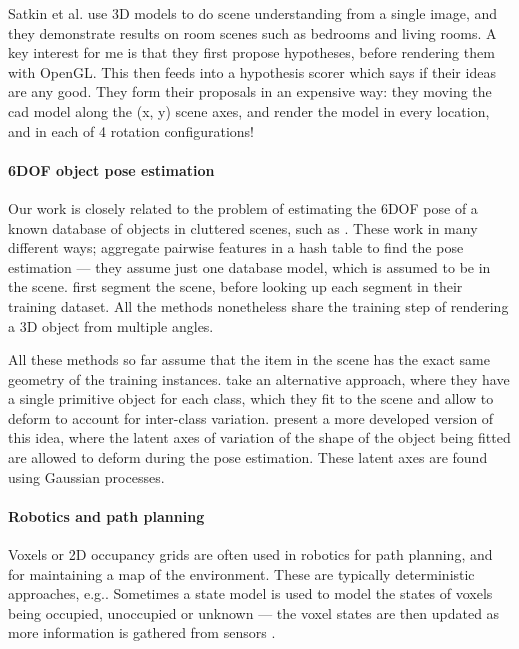 \documentclass[10pt,a4paper, twocolumn]{article}
\makeatletter
\newcommand*{\eg}{e.g.\@\xspace}
\newcommand*{\ea}{et al.\@\xspace}
\makeatother
\begin{document}
Satkin \ea \cite{satkin-bmvc-2012} use 3D models to do scene understanding from a single image, and they demonstrate results on room scenes such as bedrooms and living rooms. 
A key interest for me is that they first propose hypotheses, before rendering them with OpenGL.
This then feeds into a hypothesis scorer which says if their ideas are any good. 
They form their proposals in an expensive way: they moving the cad model along the (x, y) scene axes, and render the model in every location, and in each of 4 rotation configurations!

\paragraph{6DOF object pose estimation}
Our work is closely related to the problem of estimating the 6DOF pose of a known database of objects in cluttered scenes, such as \cite{hinterstoisser-accv-2012, drost-3dimpvt-2012, rusu-iros-2010}. 
These work in many different ways; \cite{drost-3dimpvt-2012} aggregate pairwise features in a hash table to find the pose estimation --- they assume just one database model, which is assumed to be in the scene. \cite{rusu-iros-2010} first segment the scene, before looking up each segment in their training dataset.
All the methods nonetheless share the training step of rendering a 3D object from multiple angles.

All these methods so far assume that the item in the scene has the exact same geometry of the training instances.
\cite{cocias-cgvcv-2013} take an alternative approach, where they have a single primitive object for each class, which they fit to the scene and allow to deform to account for inter-class variation.
\cite{prisacariu-iccv-2011} present a more developed version of this idea, where the latent axes of variation of the shape of the object being fitted are allowed to deform during the pose estimation. 
These latent axes are found using Gaussian processes.

\paragraph{Robotics and path planning}
Voxels or 2D occupancy grids are often used in robotics for path planning, and for maintaining a map of the environment. 
These are typically deterministic approaches, \eg \cite{jetchev-icra-2010}. Sometimes a state model is used to model the states of voxels being occupied, unoccupied or unknown --- the voxel states are then updated as more information is gathered from sensors \cite{toussaint-techreport-2007}.
\end{document}
